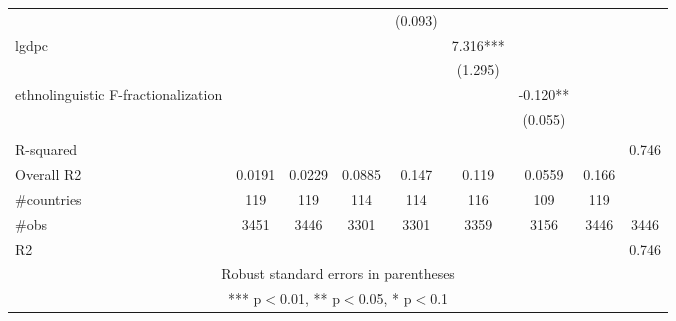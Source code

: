 \documentclass[]{article}
\begin{document}
\begin{tabular}{lcccccccc}
 &  &  &  & (0.093) &  &  &  &  \\
lgdpc &  &  &  &  & 7.316*** &  &  &  \\
 &  &  &  &  & (1.295) &  &  &  \\
ethnolinguistic F-fractionalization &  &  &  &  &  & -0.120** &  &  \\
 &  &  &  &  &  & (0.055) &  &  \\
 &  &  &  &  &  &  &  &  \\
R-squared &  &  &  &  &  &  &  & 0.746 \\
Overall R2 & 0.0191 & 0.0229 & 0.0885 & 0.147 & 0.119 & 0.0559 & 0.166 &  \\
\#countries & 119 & 119 & 114 & 114 & 116 & 109 & 119 &  \\
\#obs & 3451 & 3446 & 3301 & 3301 & 3359 & 3156 & 3446 & 3446 \\
 R2 &  &  &  &  &  &  &  & 0.746 \\ \hline
\multicolumn{9}{c}{ Robust standard errors in parentheses} \\
\multicolumn{9}{c}{ *** p$<$0.01, ** p$<$0.05, * p$<$0.1} \\
\end{tabular}
\end{document}

